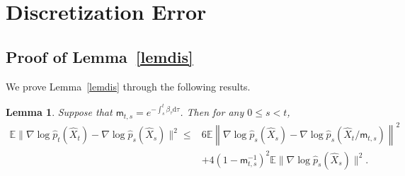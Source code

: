 \documentclass[12pts]{article}
\newtheorem{lemma}[defn]{Lemma}%
\newcommand{\diff}{\mathrm{d}}
\newcommand{\hX}{ \widehat{X}}
\newcommand{\E}{\mathbb{E}}
\newcommand{\hp}{\hat{p}}
\begin{document}
\section{Discretization Error}
\label{ap_discretization}
\subsection{Proof of Lemma~\ref{lemdis}}
We prove Lemma~\ref{lemdis} through the following results.
\begin{lemma}\label{lem2}
Suppose that $\mathsf{m}_{t,s} = e^{-\int_{s}^t \beta_\tau \diff  \tau} $. Then for any $0 \le s < t  $,
    \begin{align}
        \E \| \nabla \log \hp_t(\hX_t) - \nabla \log \hp_s(\hX_s)\|^2 \le & 6 \E \left\| \nabla \log \hp_s(\hX_s) - \nabla \log \hp_s(\hX_t/\mathsf{m}_{t,s})\right\|^2 \nonumber\\
        & + 4 (1-\mathsf{m}_{t,s}^{-1})^2 \E \|\nabla \log \hp_s(\hX_s)\|^2. \label{s6}
    \end{align}
\end{lemma}
\end{document}

